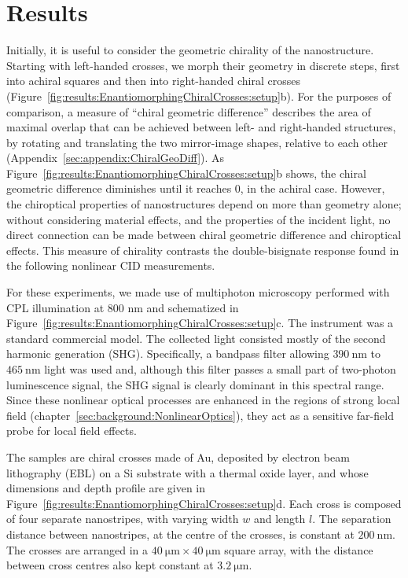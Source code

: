 \section{Results}\label{sec:results:EnantiomorphingChiralCrosses:results}

Initially, it is useful to consider the geometric chirality of the nanostructure. Starting with left-handed crosses, we morph their geometry in discrete steps, first into achiral squares and then into right-handed chiral crosses (Figure~\ref{fig:results:EnantiomorphingChiralCrosses:setup}b). 
For the purposes of comparison, a measure of ``chiral geometric difference'' describes the area of maximal overlap that can be achieved between left- and right-handed structures, by rotating and translating the two mirror-image shapes, relative to each other (Appendix~\ref{sec:appendix:ChiralGeoDiff}). 
As Figure~\ref{fig:results:EnantiomorphingChiralCrosses:setup}b shows, the chiral geometric difference diminishes until it reaches 0, in the achiral case. However, the chiroptical properties of nanostructures depend on more than geometry alone; without considering material effects, and the properties of the incident light, no direct connection can be made between chiral geometric difference and chiroptical effects. This measure of chirality contrasts the double-bisignate response found in the following nonlinear CID measurements.

For these experiments, we made use of multiphoton microscopy performed with CPL illumination at 800 nm and schematized in Figure~\ref{fig:results:EnantiomorphingChiralCrosses:setup}c. The instrument was a standard commercial model. The collected light consisted mostly of the second harmonic generation (SHG). Specifically, a bandpass filter allowing $\SI{390}{\nano\m}$ to $\SI{465}{\nano\m}$ light was used and, although this filter passes a small part of two-photon luminescence signal, the SHG signal is clearly dominant in this spectral range. Since these nonlinear optical processes are enhanced in the regions of strong local field (chapter~\ref{sec:background:NonlinearOptics}), they act as a sensitive far-field probe for local field effects. 

The samples are chiral crosses made of Au, deposited by electron beam lithography (EBL) on a Si substrate with a thermal oxide layer, and whose dimensions and depth profile are given in Figure~\ref{fig:results:EnantiomorphingChiralCrosses:setup}d. Each cross is composed of four separate nanostripes, with varying width $w$ and length $l$. The separation distance between nanostripes, at the centre of the crosses, is constant at $\SI{200}{\nano\m}$. The crosses are arranged in a $\SI{40}{\micro\m} \times \SI{40}{\micro\m}$ square array, with the distance between cross centres also kept constant at $\SI{3.2}{\micro\m}$. 

